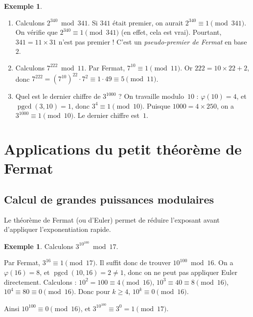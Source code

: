 \documentclass[12pt,a4paper,openany]{book}
\theoremstyle{definition}
\newtheorem{exemple}[definition]{Exemple}
\theoremstyle{plain}
\theoremstyle{remark}
\DeclareMathOperator{\pgcd}{pgcd}
\begin{document}
\begin{exemple}
\label{ex:fermat-calculs}
\leavevmode
\begin{enumerate}[label=(\roman*)]
  \item Calculons $2^{340} \bmod 341$. Si $341$ était premier, on aurait
    $2^{340} \equiv 1 \pmod{341}$. On vérifie que $2^{340} \equiv 1 \pmod{341}$
    (en effet, cela est vrai). Pourtant, $341 = 11 \times 31$ n'est pas premier !
    C'est un \emph{pseudo-premier de Fermat}
    en base~$2$.
  \item Calculons $7^{222} \bmod 11$. Par Fermat, $7^{10} \equiv 1 \pmod{11}$.
    Or $222 = 10 \times 22 + 2$, donc
    $7^{222} = (7^{10})^{22} \cdot 7^2 \equiv 1 \cdot 49 \equiv 5 \pmod{11}$.
  \item Quel est le dernier chiffre de $3^{1000}$ ? On travaille modulo~$10$ :
    $\varphi(10) = 4$, et $\pgcd(3, 10) = 1$, donc $3^4 \equiv 1 \pmod{10}$.
    Puisque $1000 = 4 \times 250$, on a $3^{1000} \equiv 1 \pmod{10}$.
    Le dernier chiffre est~$1$.
\end{enumerate}
\end{exemple}

\section{Applications du petit théorème de Fermat}
\label{sec:fermat-appli}

\subsection{Calcul de grandes puissances modulaires}
\label{subsec:grandes-puiss}

Le théorème de Fermat (ou d'Euler) permet de réduire l'exposant avant d'appliquer
l'exponentiation rapide.

\begin{exemple}
\label{ex:grande-puissance}
Calculons $3^{10^{100}} \bmod 17$.

Par Fermat, $3^{16} \equiv 1 \pmod{17}$. Il suffit donc de trouver
$10^{100} \bmod 16$. On a $\varphi(16) = 8$, et $\pgcd(10, 16) = 2 \neq 1$,
donc on ne peut pas appliquer Euler directement. Calculons :
$10^2 = 100 \equiv 4 \pmod{16}$, $10^3 \equiv 40 \equiv 8 \pmod{16}$,
$10^4 \equiv 80 \equiv 0 \pmod{16}$. Donc pour $k \geqslant 4$,
$10^k \equiv 0 \pmod{16}$.

Ainsi $10^{100} \equiv 0 \pmod{16}$, et
$3^{10^{100}} \equiv 3^0 = 1 \pmod{17}$.
\end{exemple}
\end{document}
